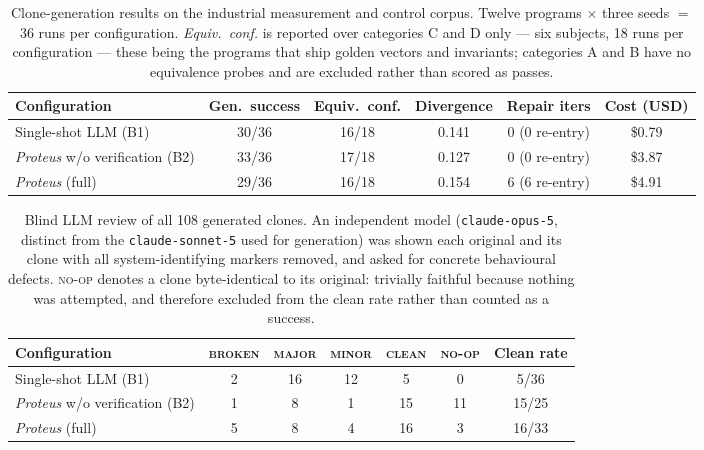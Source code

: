 \begin{table}[t]
\centering
\caption{Clone-generation results on the industrial measurement and
control corpus. Twelve programs $\times$ three seeds $=$ 36 runs per
configuration. \emph{Equiv.\ conf.} is reported over categories C and D
only --- six subjects, 18 runs per configuration --- these being the
programs that ship golden vectors and invariants;
categories A and B have no equivalence probes and are excluded rather
than scored as passes.}
\label{tab:results}
\small
\begin{tabular}{lccccc}
\toprule
Configuration & Gen.\ success & Equiv.\ conf. & Divergence & Repair iters & Cost (USD) \\
\midrule
Single-shot LLM (B1) & 30/36 & 16/18 & 0.141 & 0 (0 re-entry) & \$0.79 \\
\emph{Proteus} w/o verification (B2) & 33/36 & 17/18 & 0.127 & 0 (0 re-entry) & \$3.87 \\
\emph{Proteus} (full) & 29/36 & 16/18 & 0.154 & 6 (6 re-entry) & \$4.91 \\
\bottomrule
\end{tabular}
\end{table}

\begin{table}[t]
\centering
\caption{Blind LLM review of all 108 generated clones. An independent
model (\texttt{claude-opus-5}, distinct from the \texttt{claude-sonnet-5}
used for generation) was shown each original and its clone with all
system-identifying markers removed, and asked for concrete behavioural
defects. \textsc{no-op} denotes a clone byte-identical to its original:
trivially faithful because nothing was attempted, and therefore excluded
from the clean rate rather than counted as a success.}
\label{tab:judge}
\small
\begin{tabular}{lcccccc}
\toprule
Configuration & \textsc{broken} & \textsc{major} & \textsc{minor} & \textsc{clean} & \textsc{no-op} & Clean rate \\
\midrule
Single-shot LLM (B1) & 2 & 16 & 12 & 5 & 0 & 5/36 \\
\emph{Proteus} w/o verification (B2) & 1 & 8 & 1 & 15 & 11 & 15/25 \\
\emph{Proteus} (full) & 5 & 8 & 4 & 16 & 3 & 16/33 \\
\bottomrule
\end{tabular}
\end{table}

